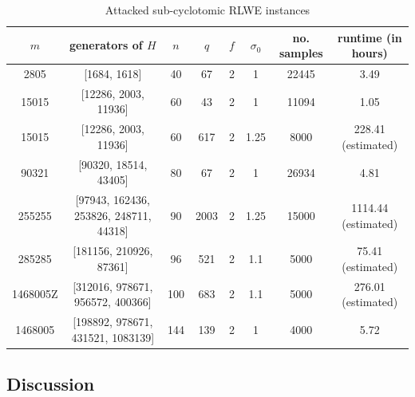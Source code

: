 \documentclass[envcountsect]{llncs}
\begin{document}
\begin{table}
\caption{Attacked sub-cyclotomic RLWE instances}
\label{tab: attacked}
\begin{center}
\begin{tabular}{c|c|c|c|c|c|c|c}
$m$ & generators of $H$ & $n$ & $q$ & $f$ & $\sigma_0$ & no. samples & runtime (in hours) \\ \hline
2805 &  [1684, 1618] & 40 & 67 & 2 & 1 & 22445 & 3.49 \\
15015 & [12286, 2003, 11936] & 60 & 43 & 2 & 1 & 11094 & 1.05 \\
15015 & [12286, 2003, 11936] & 60 & 617 & 2 & 1.25 & 8000 & 228.41 (estimated)  \\
90321 & [90320, 18514, 43405] & 80 & 67 & 2 & 1 & 26934 & 4.81 \\
255255 &  [97943, 162436, 253826, 248711, 44318] & 90 & 2003 & 2 & 1.25 & 15000 &  1114.44 (estimated) \\
285285 & [181156, 210926, 87361] & 96 & 521  & 2 & 1.1 & 5000 & 75.41 (estimated) \\
1468005Z & [312016, 978671, 956572, 400366] & 100 & 683 & 2 & 1.1
& 5000 &  276.01 (estimated) \\
1468005 & [198892, 978671, 431521, 1083139] & 144 & 139 & 2 & 1 &  4000 &  5.72
\end{tabular}
\end{center}
\end{table}


\subsection{Discussion}
\end{document}
